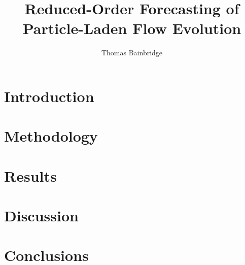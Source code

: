 \documentclass[preprint,a4paper,12pt]{elsarticle}
\begin{document}
\begin{frontmatter}

\title{Reduced-Order Forecasting of Particle-Laden Flow Evolution}

\author{Thomas Bainbridge}

\begin{abstract}

\end{abstract}

\begin{keyword}

\end{keyword}

\end{frontmatter}

\section{Introduction}

\section{Methodology}

\section{Results}

\section{Discussion}

\section{Conclusions}

%
%
\end{document}
